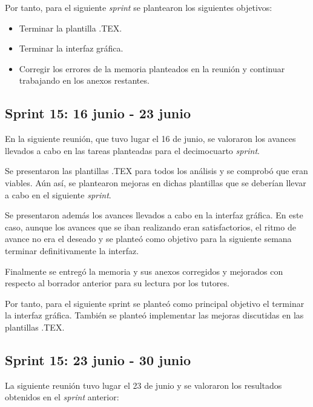 Por tanto, para el siguiente \textit{sprint} se plantearon los siguientes objetivos:

\begin{itemize}
\item Terminar la plantilla .TEX.
\item Terminar la interfaz gráfica.
\item Corregir los errores de la memoria planteados en la reunión y continuar trabajando en los anexos restantes.
\end{itemize}

\subsection{Sprint 15: 16 junio - 23 junio}

En la siguiente reunión, que tuvo lugar el 16 de junio, se valoraron los avances llevados a cabo en las tareas planteadas para el decimocuarto \textit{sprint}. 

Se presentaron las plantillas .TEX para todos los análisis y se comprobó que eran viables. Aún así, se plantearon mejoras en dichas plantillas que se deberían llevar a cabo en el siguiente \textit{sprint}. 

Se presentaron además los avances llevados a cabo en la interfaz gráfica. En este caso, aunque los avances que se iban realizando eran satisfactorios, el ritmo de avance no era el deseado y se planteó como objetivo para la siguiente semana terminar definitivamente la interfaz.

Finalmente se entregó la memoria y sus anexos corregidos y mejorados con respecto al borrador anterior para su lectura por los tutores.

Por tanto, para el siguiente sprint se planteó como principal objetivo el terminar la interfaz gráfica. También se planteó implementar las mejoras discutidas en las plantillas .TEX.

\subsection{Sprint 15: 23 junio - 30 junio}

La siguiente reunión tuvo lugar el 23 de junio y se valoraron los resultados obtenidos en el \textit{sprint} anterior:

